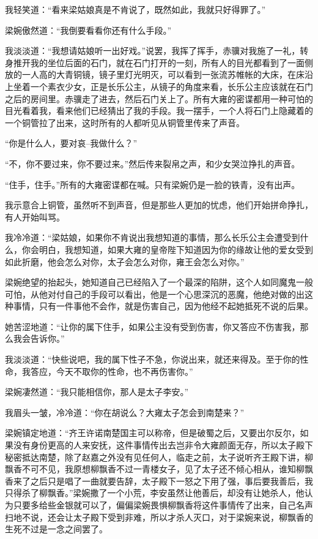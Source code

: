 我轻笑道：“看来梁姑娘真是不肯说了，既然如此，我就只好得罪了。”

梁婉傲然道：“我倒要看看你还有什么手段。”

我淡淡道：“我想请姑娘听一出好戏。”说罢，我挥了挥手，赤骥对我施了一礼，转身推开我的坐位后面的石门，就在石门打开的一刻，所有人的目光都看到了一面侧放的一人高的大青铜镜，镜子里灯光明灭，可以看到一张流苏帷帐的大床，在床沿上坐着一个素衣少女，正是长乐公主，从镜子的角度来看，长乐公主应该就在石门之后的房间里。赤骥走了进去，然后石门关上了。所有大雍的密谍都用一种可怕的目光看着我，看来他们已经猜出了我的手段。我一摆手，一个人将石门上隐藏着的一个铜管拉了出来，这时所有的人都听见从铜管里传来了声音。

“你是什么人，要对哀--我做什么？”

“不，你不要过来，你不要过来。”然后传来裂帛之声，和少女哭泣挣扎的声音。

“住手，住手。”所有的大雍密谍都在喊。只有梁婉仍是一脸的铁青，没有出声。

我示意合上铜管，虽然听不到声音，但是那些人更加的忧虑，他们开始拼命挣扎，有人开始叫骂。

我冷冷道：“梁姑娘，如果你不肯说出我想知道的事情，那么长乐公主会遭受到什么，你会明白，我想知道，如果大雍的皇帝陛下知道因为你的缘故让他的爱女受到如此折磨，他会怎么对你，太子会怎么对你，雍王会怎么对你。”

梁婉绝望的抬起头，她知道自己已经陷入了一个最深的陷阱，这个人如同魔鬼一般可怕，从他对付自己的手段可以看出，他是一个心思深沉的恶魔，他绝对做的出这种事情，只有一件事他不会作，就是伤害自己，因为他经不起她抵死不说的后果。

她苦涩地道：“让你的属下住手，如果公主没有受到伤害，你又答应不伤害我，那么我会告诉你。”

我淡淡道：“快些说吧，我的属下性子不急，你说出来，就还来得及。至于你的性命，我答应，今天不取你的性命，也不再伤害你。”

梁婉凄然道：“我只能相信你，那人是太子李安。”

我眉头一皱，冷冷道：“你在胡说么？大雍太子怎会到南楚来？”

梁婉镇定地道：“齐王许诺南楚国主可以称帝，但是破蜀之后，又要出尔反尔，如果没有身份更高的人来安抚，这件事情传出去岂非令大雍颜面无存，所以太子殿下秘密抵达南楚，除了赵嘉之外没有见任何人，临走之前，太子说听齐王殿下讲，柳飘香不可不见，我原想柳飘香不过一青楼女子，见了太子还不倾心相从，谁知柳飘香来了之后只是唱了一曲就要告辞，太子殿下一怒之下用了强，事后要我善后，我只得杀了柳飘香。”梁婉撒了一个小荒，李安虽然让他善后，却没有让她杀人，他认为只要多给些金银就可以了，偏偏梁婉畏惧柳飘香将这件事情传了出来，自己名声扫地不说，还会让太子殿下受到非难，所以才杀人灭口，对于梁婉来说，柳飘香的生死不过是一念之间罢了。

